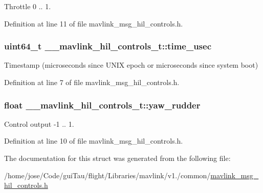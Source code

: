 Throttle 0 .. 1. 



Definition at line 11 of file mavlink\-\_\-msg\-\_\-hil\-\_\-controls.\-h.

\hypertarget{struct____mavlink__hil__controls__t_a209e91b6d93c47abba3dc4ed3c6625f2}{
\subsubsection[{time\-\_\-usec}]{\setlength{\rightskip}{0pt plus 5cm}uint64\-\_\-t \-\_\-\-\_\-mavlink\-\_\-hil\-\_\-controls\-\_\-t\-::time\-\_\-usec}}\label{struct____mavlink__hil__controls__t_a209e91b6d93c47abba3dc4ed3c6625f2}


Timestamp (microseconds since U\-N\-I\-X epoch or microseconds since system boot) 



Definition at line 7 of file mavlink\-\_\-msg\-\_\-hil\-\_\-controls.\-h.

\hypertarget{struct____mavlink__hil__controls__t_addcaf6167ddb280643e69558a0532dd8}{
\subsubsection[{yaw\-\_\-rudder}]{\setlength{\rightskip}{0pt plus 5cm}float \-\_\-\-\_\-mavlink\-\_\-hil\-\_\-controls\-\_\-t\-::yaw\-\_\-rudder}}\label{struct____mavlink__hil__controls__t_addcaf6167ddb280643e69558a0532dd8}


Control output -\/1 .. 1. 



Definition at line 10 of file mavlink\-\_\-msg\-\_\-hil\-\_\-controls.\-h.



The documentation for this struct was generated from the following file\-:\begin{DoxyCompactItemize}
\item 
/home/jose/\-Code/gui\-Tau/flight/\-Libraries/mavlink/v1./common/\hyperlink{mavlink__msg__hil__controls_8h}{mavlink\-\_\-msg\-\_\-hil\-\_\-controls.\-h}\end{DoxyCompactItemize}
